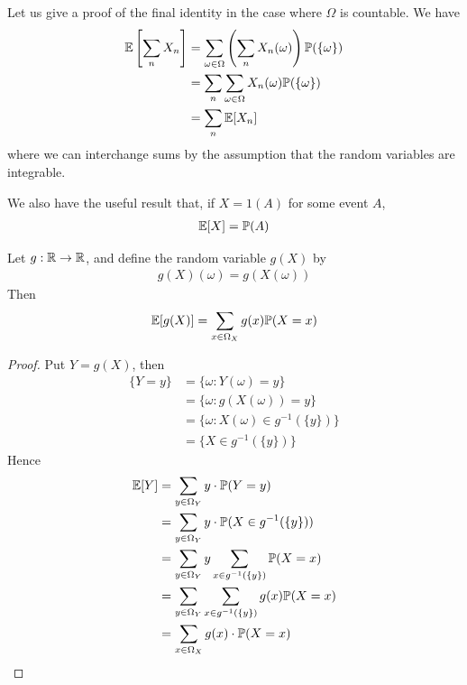 \documentclass{../../template/note}
\begin{document}
    Let us give a proof of the final identity in the case where \(\Omega\) is countable. We have
    \begin{align*}
        \mathbb E\left[\sum_n X_n\right] &= \sum_{\omega \in \Omega} \left(\sum_n X_n(\omega)\right) \mathbb P(\{\omega\}) \\
        &= \sum_n \sum_{\omega \in \Omega} X_n(\omega) \mathbb P(\{\omega\}) \\
        &= \sum_n \mathbb E[X_n]
    \end{align*}
    where we can interchange sums by the assumption that the random variables are integrable.

    We also have the useful result that, if \(X = 1(A)\) for some event \(A\),
    \begin{align*}
        \mathbb E[X] = \mathbb P(A)
    \end{align*}
    
    \begin{proposition}
        Let \(g: \mathbb R \to \mathbb R\), and define the random variable \(g(X)\) by
        \begin{align*}
            g(X)(\omega) = g(X(\omega))
        \end{align*}
        Then
        \begin{align*}
            \mathbb E[g(X)] = \sum_{x \in \Omega_X} g(x) \mathbb P(X = x)
        \end{align*}
    \end{proposition}
    
    \begin{proof}
        Put \(Y = g(X)\), then
        \begin{align*}
            \{Y = y\} &= \{\omega: Y(\omega) = y\} \\
            &= \{\omega: g(X(\omega)) = y\} \\
            &= \{\omega: X(\omega) \in g^{-1}(\{y\})\} \\
            &= \{X \in g^{-1}(\{y\})\}
        \end{align*}
        Hence
        \begin{align*}
            \mathbb E[Y] &= \sum_{y \in \Omega_Y} y \cdot \mathbb P(Y = y) \\
            &= \sum_{y \in \Omega_Y} y \cdot \mathbb P(X \in g^{-1}(\{y\})) \\
            &= \sum_{y \in \Omega_Y} y \sum_{x \in g^{-1}(\{y\})} \mathbb P(X = x) \\
            &= \sum_{y \in \Omega_Y} \sum_{x \in g^{-1}(\{y\})} g(x) \mathbb P(X = x) \\
            &= \sum_{x \in \Omega_X} g(x) \cdot \mathbb P(X = x)
        \end{align*}
    \end{proof}
    
\end{document}
